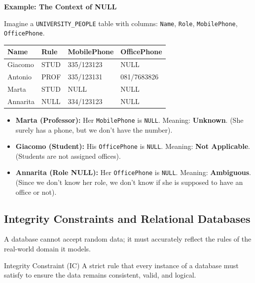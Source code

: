 \vspace{0.2cm}
\begin{example}{\textbf{Example: The Context of NULL}}

Imagine a \texttt{UNIVERSITY\_PEOPLE} table with columns: \texttt{Name}, \texttt{Role}, \texttt{MobilePhone}, \texttt{OfficePhone}.


\begin{table}[h!]
\centering
\begin{tabular}{|l|l|l|l|}
\hline
\textbf{Name} & \textbf{Rule} & \textbf{MobilePhone} & \textbf{OfficePhone} \\ \hline
Giacomo   & STUD & 335/123123 & NULL        \\ \hline
Antonio   & PROF & 335/123131 & 081/7683826 \\ \hline
Marta     & STUD & NULL       & NULL        \\ \hline
Annarita  & NULL & 334/123123 & NULL        \\ \hline
\end{tabular}
\end{table}


\begin{itemize}
    \item \textbf{Marta (Professor):} Her \texttt{MobilePhone} is \texttt{NULL}. Meaning: \textbf{Unknown}. (She surely has a phone, but we don't have the number).
    \item \textbf{Giacomo (Student):} His \texttt{OfficePhone} is \texttt{NULL}. Meaning: \textbf{Not Applicable}. (Students are not assigned offices).
    \item \textbf{Annarita (Role NULL):} Her \texttt{OfficePhone} is \texttt{NULL}. Meaning: \textbf{Ambiguous}. (Since we don't know her role, we don't know if she is supposed to have an office or not).
\end{itemize}
\end{example}

\subsection{Integrity Constraints and Relational Databases}
A database cannot accept random data; it must accurately reflect the rules of the real-world domain it models.

\begin{defbox}{Integrity Constraint (IC)}
A strict rule that every instance of a database must satisfy to ensure the data remains consistent, valid, and logical. 
\end{defbox}

